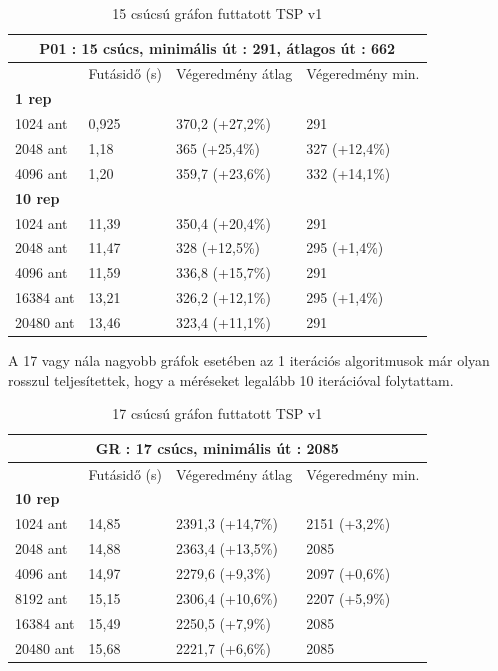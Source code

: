 \begin{table}[ht!]
	\centering
	\begin{tabular}{|p{2cm}||p{3cm}|p{3.5cm}|p{3.5cm}|}
		\hline
		\multicolumn{4}{|c|}{P01 : 15 csúcs, minimális út : 291, átlagos út : 662} \\
		\hline
		& Futásidő (s) & Végeredmény átlag & Végeredmény min.\\
		\hline
		\textbf{1 rep} & & &\\
		1024 ant & 0,925 & 370,2 (+27,2\%) & 291 \\
		2048 ant & 1,18 & 365 (+25,4\%) & 327 (+12,4\%) \\
		4096 ant & 1,20 & 359,7 (+23,6\%) & 332 (+14,1\%)\\
		\hline
		\textbf{10 rep} & & &\\
		1024 ant & 11,39 & 350,4 (+20,4\%) & 291\\
		2048 ant & 11,47 & 328 (+12,5\%) & 295 (+1,4\%)\\
		4096 ant & 11,59 & 336,8 (+15,7\%) & 291\\
		16384 ant & 13,21 & 326,2 (+12,1\%) & 295 (+1,4\%) \\
		20480 ant & 13,46 & 323,4 (+11,1\%) & 291 \\
		\hline
	\end{tabular}
	\caption{15 csúcsú gráfon futtatott TSP v1}
	\label{table:TSPv1_15}
\end{table}

A 17 vagy nála nagyobb gráfok esetében az 1 iterációs algoritmusok már olyan rosszul teljesítettek, hogy a méréseket legalább 10 iterációval folytattam.

\begin{table}[ht!]
	\centering
	\begin{tabular}{|p{2cm}||p{3cm}|p{3.5cm}|p{3.5cm}|}
		\hline
		\multicolumn{4}{|c|}{GR : 17 csúcs, minimális út : 2085} \\
		\hline
		& Futásidő (s) & Végeredmény átlag & Végeredmény min.\\
		\hline
		\textbf{10 rep} & & & \\
		1024 ant & 14,85 & 2391,3 (+14,7\%) & 2151 (+3,2\%)\\
		2048 ant & 14,88 & 2363,4 (+13,5\%) & 2085\\
		4096 ant & 14,97 & 2279,6 (+9,3\%) & 2097 (+0,6\%) \\
		8192 ant & 15,15 & 2306,4 (+10,6\%) & 2207 (+5,9\%)\\
		16384 ant & 15,49 & 2250,5 (+7,9\%) & 2085 \\
		20480 ant & 15,68 & 2221,7 (+6,6\%) & 2085 \\
		\hline
	\end{tabular}
	\caption{17 csúcsú gráfon futtatott TSP v1}
	\label{table:TSPv1_17}
\end{table}

